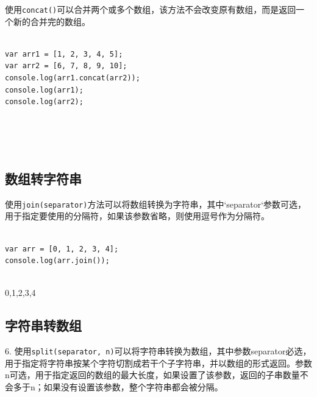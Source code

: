 使用\lstinline|concat()|可以合并两个或多个数组，该方法不会改变原有数组，而是返回一个新的合并完的数组。 \\

 \\

\begin{lstlisting}[style=htmlcssjs]
var arr1 = [1, 2, 3, 4, 5];
var arr2 = [6, 7, 8, 9, 10];
console.log(arr1.concat(arr2));
console.log(arr1);
console.log(arr2);
\end{lstlisting}

\begin{tcolorbox}
	 \\
	\text{[1, 2, 3, 4, 5, 6, 7, 8, 9, 10]} \\
	\text{[1, 2, 3, 4, 5]} \\
	\text{[6, 7, 8, 9, 10]}
\end{tcolorbox}

\subsection{数组转字符串}

使用\lstinline|join(separator)|方法可以将数组转换为字符串，其中`separator`参数可选，用于指定要使用的分隔符，如果该参数省略，则使用逗号作为分隔符。 \\

 \\

\begin{lstlisting}[style=htmlcssjs]
var arr = [0, 1, 2, 3, 4];
console.log(arr.join());
\end{lstlisting}

\begin{tcolorbox}
	 \\
	0,1,2,3,4
\end{tcolorbox}

\subsection{字符串转数组}

6. 使用\lstinline|split(separator, n)|可以将字符串转换为数组，其中参数separator必选，用于指定将字符串按某个字符切割成若干个子字符串，并以数组的形式返回。参数n可选，用于指定返回的数组的最大长度，如果设置了该参数，返回的子串数量不会多于n；如果没有设置该参数，整个字符串都会被分隔。 \\

